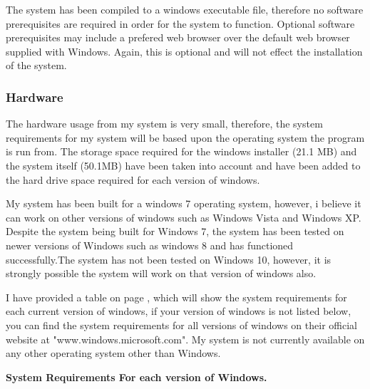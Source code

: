 The system has been compiled to a windows executable file, therefore no software prerequisites are required in order for the system to function. Optional software prerequisites may include a prefered web browser over the default web browser supplied with Windows. Again, this is optional and will not effect the installation of the system.

\subsubsection{Hardware}

The hardware usage from my system is very small, therefore, the system requirements for my system will be based upon the operating system the program is run from. The storage space required for the windows installer (21.1 MB) and the system itself (50.1MB) have been taken into account and have been added to the hard drive space required for each version of windows.

 My system has been built for a windows 7 operating system, however, i believe it can work on other versions of windows such as Windows Vista and Windows XP. Despite the system being built for Windows 7, the system has been tested on newer versions of Windows such as windows 8 and has functioned successfully.The system has not been tested on Windows 10, however, it is strongly possible the system will work on that version of windows also. 

I have provided a table on page \pageref{hardware-table}, which will show the system requirements for each current version of windows, if your version of windows is not listed below, you can find the system requirements for all versions of windows on their official website at "www.windows.microsoft.com". My system is not currently available on any other operating system other than Windows.

\pagebreak

\textbf{System Requirements For each version of Windows.} \newline

